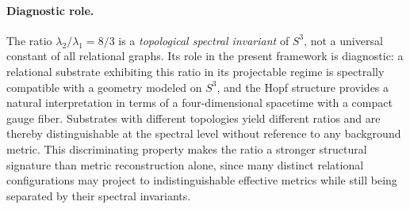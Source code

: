   \paragraph{Diagnostic role.}
    The ratio $\lambda_2/\lambda_1 = 8/3$ is a \emph{topological spectral invariant}
    of $S^3$, not a universal constant of all relational graphs.
    Its role in the present framework is diagnostic: a relational substrate exhibiting this
    ratio in its projectable regime is spectrally compatible with a geometry modeled on $S^3$,
    and the Hopf structure provides a natural interpretation in terms of a four-dimensional
    spacetime with a compact gauge fiber.
    Substrates with different topologies yield different ratios and are thereby
    distinguishable at the spectral level without reference to any background metric.
    This discriminating property makes the ratio a stronger structural signature than
    metric reconstruction alone, since many distinct relational configurations may project
    to indistinguishable effective metrics while still being separated by their spectral
    invariants.
